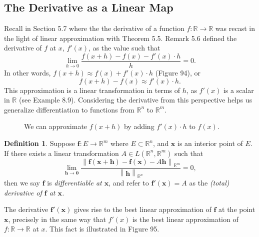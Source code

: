 \documentclass{article}
\newcommand{\R}{\mathbb{R}}
\newcommand{\x}{\mathbf{x}}
\newcommand{\f}{\mathbf{f}}
\newcommand{\ze}{\mathbf{0}}
\newcommand{\norm}[1]{\left\lVert#1\right\rVert}
\theoremstyle{definition}
\newtheorem{definition}{Definition}[section]
\begin{document}
\subsection{The Derivative as a Linear Map}
Recall in Section 5.7 where the the derivative of a function $ f:\R\to\R $ was recast in the light of linear approximation with Theorem 5.5. Remark 5.6 defined the derivative of $ f $ at $ x $, $ f'(x) $, as the value such that 
$$ \lim\limits_{h\to 0}\frac{f(x+h)-f(x)-f'(x)\cdot h}{h}=0.$$ In other words, $ f(x+h)\approx f(x)+f'(x)\cdot h $ (Figure 94), or $$f(x+h)-f(x)\approx f'(x)\cdot h .$$ This approximation is a linear transformation in terms of $ h $, as $ f'(x) $ is a scalar in $ \R $ (see Example 8.9). Considering the derivative from this perspective helps us generalize differentiation to functions from $ \R^n $ to $ \R^m $. 
\begin{figure}[h!]
	\centering
	\caption{We can approximate $ f(x+h) $ by adding $ f'(x)\cdot h $ to $ f(x) $. }
\end{figure}
\begin{definition}
	Suppose $ \f:E\to\R^m $ where $ E\subset \R^n $, and $ \x $ is an interior point of $ E $. If there exists a linear transformation $ A\in L(\R^n,\R^m)$ such that \begin{equation}\label{key}
		\lim\limits_{\mathbf h\to \ze}\frac{\norm{\f(\x+\mathbf h) - \f(\x)-A\mathbf{h}}_{\R^m}}{\norm{\mathbf h}_{\R^n}} = 0,
	\end{equation}
	then we say $ \f $ is \textit{\color{red}differentiable at $ \x $}, and refer to $ \f'(\x)=A $ as the \textit{\color{red}(total) derivative of $ \f $ at $ \x $.} 
\end{definition}
The derivative $ \f'(\x) $ gives rise to the best linear approximation of $ \f $ at the point $ \x $, precisely in the same way that $ f'(x) $ is the best linear approximation of $ f:\R\to\R $ at $ x $. This fact is illustrated in Figure 95.
\end{document}
